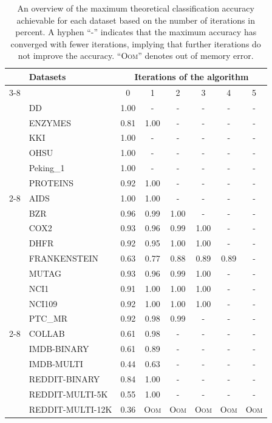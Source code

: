 \begin{table}[H]
	\caption{An overview of the maximum theoretical classification accuracy achievable for each dataset based on the number of \wl iterations in percent. A hyphen ``-'' indicates that the maximum accuracy has converged with fewer iterations, implying that further iterations do not improve the accuracy. ``\textsc{Oom}'' denotes out of memory error.}
    \centering
	\label{tab:max_accuracies_app}
	\begin{tabular}{@{}c <{\enspace}@{}lcccccc@{}}	\toprule
			& \multirow{3}{*}{\vspace*{4pt}\textbf{Datasets}}&\multicolumn{6}{c}{\textbf{Iterations of the \wl algorithm}}\\\cmidrule{3-8}
			& & {0}  & {1}  & {2}  & {3} & {4}  & {5}
			\\
			\toprule
			\multirow{4}{*}{\rotatebox{90}{Bioinformatics}}
            & DD &1.00 & - & - & - & - & - \\
            & ENZYMES &0.81 & 1.00 & - & - & - & - \\
            & KKI & 1.00 & - & - & - & - & - \\
            & OHSU & 1.00 & - & - & - & - & - \\
            & Peking\_1 & 1.00 & - & - & - & - & - \\
            & PROTEINS &0.92 & 1.00 & - & - & - & -\\

            \cmidrule{2-8}
            \multirow{9}{*}{\rotatebox{90}{Small molecules}}
            & AIDS & 1.00 & 1.00 & - & - & - & - \\
            & BZR & 0.96 & 0.99 & 1.00 & - & - & - \\
            & COX2 & 0.93 & 0.96 & 0.99 & 1.00 & - & - \\
            & DHFR & 0.92 & 0.95 & 1.00 & 1.00 & - & - \\
            & FRANKENSTEIN & 0.63 & 0.77 & 0.88 & 0.89 & 0.89 & - \\
            & MUTAG &0.93 & 0.96 & 0.99 & 1.00 & - & - \\
            & NCI1 &0.91 & 1.00 & 1.00 & 1.00 & - & - \\
            & NCI109 & 0.92 & 1.00 & 1.00 & 1.00 & - & - \\
            & PTC\_MR &0.92 & 0.98 & 0.99 & - & - & - \\
            \cmidrule{2-8}

            \multirow{6}{*}{\rotatebox{90}{Social networks}}
            & COLLAB &0.61 & 0.98 & - & - & - & - \\
            & IMDB-BINARY &0.61 & 0.89 & - & - & - & - \\
            & IMDB-MULTI &0.44 & 0.63 & - & - & - & - \\
            & REDDIT-BINARY &0.84 & 1.00 & - & - & - & - \\
            & REDDIT-MULTI-5K & 0.55 & 1.00 & - & - & - & - \\
            & REDDIT-MULTI-12K & 0.36 & \textsc{Oom} & \textsc{Oom} & \textsc{Oom} & \textsc{Oom} & \textsc{Oom} \\
			\bottomrule
		\end{tabular}             
\end{table}
